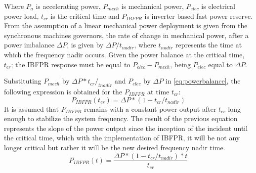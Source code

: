 Where $ P_a $ is accelerating power, $ P_{mech} $ is mechanical power, $ P_{elec} $ is electrical power load, $ t_{cr} $ is the critical time and $ P_{IBFPR} $ is inverter based fast power reserve.
From the assumption of a linear mechanical power deployment is given from the synchronous machines governors, the rate of change in mechanical power, after a power imbalance $ \Delta P $, is given by $ \Delta P/t_{nadir} $, where $ t_{nadir} $ represents the time at which the frequency nadir occurs. Given the power balance at the critical time, $ t_{cr} $; the IBFPR response must be equal to $ P_{elec}-P_{mech} $, being $ P_{elec} $ equal to $ \Delta P $. %


Substituting $ P_{mech} $ by $ \Delta P* t_{cr} /_{tnadir} $ and $ P_{elec} $ by $ \Delta P $ in \eqref{eq:powerbalance}, the following expression is obtained for the $ P_{IBFPR} $ at time $ t_{cr} $:
\begin{equation}
	\label{eq:p_at_tcr}
	P_{IBFPR} (t_{cr} )=\Delta P*(1-t_{cr}/t_{nadir} )
\end{equation}
It is assumed that $ P_{IBFPR} $ remains with a constant power output after $ t_{cr} $ long enough to stabilize the system frequency. The result of the previous equation represents the slope of the power output since the inception of the incident until the critical time, which with the implementation of IBFPR, it will be not any longer critical but rather it will be the new desired frequency nadir time.
\begin{equation}
	\label{eq:IBFPR}
	P_{IBFPR} (t)=\dfrac{\Delta P*(1-t_{cr}/t_{nadir} )*t}{t_{cr}}
\end{equation}

